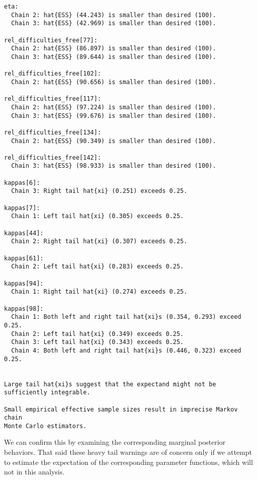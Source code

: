 \documentclass[
  letterpaper,
  DIV=11,
  numbers=noendperiod]{scrartcl}
\newenvironment{Shaded}{\begin{snugshade}}{\end{snugshade}}
\newcommand{\AttributeTok}[1]{\textcolor[rgb]{0.40,0.45,0.13}{#1}}
\newcommand{\DecValTok}[1]{\textcolor[rgb]{0.68,0.00,0.00}{#1}}
\newcommand{\FunctionTok}[1]{\textcolor[rgb]{0.28,0.35,0.67}{#1}}
\newcommand{\NormalTok}[1]{\textcolor[rgb]{0.00,0.23,0.31}{#1}}
\newcommand{\SpecialCharTok}[1]{\textcolor[rgb]{0.37,0.37,0.37}{#1}}
\newcommand{\StringTok}[1]{\textcolor[rgb]{0.13,0.47,0.30}{#1}}
\begin{document}
\begin{verbatim}
eta:
  Chain 2: hat{ESS} (44.243) is smaller than desired (100).
  Chain 3: hat{ESS} (42.969) is smaller than desired (100).

rel_difficulties_free[77]:
  Chain 2: hat{ESS} (86.897) is smaller than desired (100).
  Chain 3: hat{ESS} (89.644) is smaller than desired (100).

rel_difficulties_free[102]:
  Chain 2: hat{ESS} (90.656) is smaller than desired (100).

rel_difficulties_free[117]:
  Chain 2: hat{ESS} (97.224) is smaller than desired (100).
  Chain 3: hat{ESS} (99.676) is smaller than desired (100).

rel_difficulties_free[134]:
  Chain 2: hat{ESS} (90.349) is smaller than desired (100).

rel_difficulties_free[142]:
  Chain 3: hat{ESS} (98.933) is smaller than desired (100).

kappas[6]:
  Chain 3: Right tail hat{xi} (0.251) exceeds 0.25.

kappas[7]:
  Chain 1: Left tail hat{xi} (0.305) exceeds 0.25.

kappas[44]:
  Chain 2: Right tail hat{xi} (0.307) exceeds 0.25.

kappas[61]:
  Chain 2: Left tail hat{xi} (0.283) exceeds 0.25.

kappas[94]:
  Chain 1: Right tail hat{xi} (0.274) exceeds 0.25.

kappas[98]:
  Chain 1: Both left and right tail hat{xi}s (0.354, 0.293) exceed 0.25.
  Chain 2: Left tail hat{xi} (0.349) exceeds 0.25.
  Chain 3: Left tail hat{xi} (0.343) exceeds 0.25.
  Chain 4: Both left and right tail hat{xi}s (0.446, 0.323) exceed 0.25.


Large tail hat{xi}s suggest that the expectand might not be
sufficiently integrable.

Small empirical effective sample sizes result in imprecise Markov chain
Monte Carlo estimators.
\end{verbatim}

We can confirm this by examining the corresponding marginal posterior
behaviors. That said these heavy tail warnings are of concern only if we
attempt to estimate the expectation of the corresponding parameter
functions, which will not in this analysis.

\begin{Shaded}
\end{Shaded}
\end{document}
